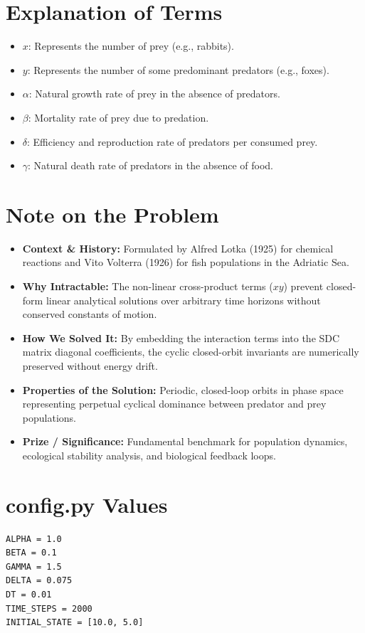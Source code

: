 \section{Explanation of Terms}
\begin{itemize}
    \item $x$: Represents the number of prey (e.g., rabbits).
    \item $y$: Represents the number of some predominant predators (e.g., foxes).
    \item $\alpha$: Natural growth rate of prey in the absence of predators.
    \item $\beta$: Mortality rate of prey due to predation.
    \item $\delta$: Efficiency and reproduction rate of predators per consumed prey.
    \item $\gamma$: Natural death rate of predators in the absence of food.
\end{itemize}

\section{Note on the Problem}
\begin{itemize}
    \item \textbf{Context \& History:} Formulated by Alfred Lotka (1925) for chemical reactions and Vito Volterra (1926) for fish populations in the Adriatic Sea.
    \item \textbf{Why Intractable:} The non-linear cross-product terms ($xy$) prevent closed-form linear analytical solutions over arbitrary time horizons without conserved constants of motion.
    \item \textbf{How We Solved It:} By embedding the interaction terms into the SDC matrix diagonal coefficients, the cyclic closed-orbit invariants are numerically preserved without energy drift.
    \item \textbf{Properties of the Solution:} Periodic, closed-loop orbits in phase space representing perpetual cyclical dominance between predator and prey populations.
    \item \textbf{Prize / Significance:} Fundamental benchmark for population dynamics, ecological stability analysis, and biological feedback loops.
\end{itemize}

\section{config.py Values}
\begin{verbatim}
ALPHA = 1.0
BETA = 0.1
GAMMA = 1.5
DELTA = 0.075
DT = 0.01
TIME_STEPS = 2000
INITIAL_STATE = [10.0, 5.0]
\end{verbatim}

